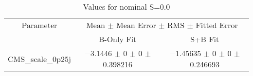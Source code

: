 \begin{table}
\centering
\caption{Values for nominal S=0.0}
\begin{tabular}{ccc}
\toprule
Parameter & \multicolumn{2}{c}{Mean $\pm$ Mean Error $\pm$ RMS $\pm$ Fitted Error}\\
 & B-Only Fit & S+B Fit\\
\midrule
CMS\_scale\_0p25j & \num{-3.1446} $\pm$ \num{0} $\pm$ \num{0} $\pm$ \num{0.398216} & \num{-1.45635} $\pm$ \num{0} $\pm$ \num{0} $\pm$ \num{0.246693}\\
\bottomrule
\end{tabular}
\end{table}